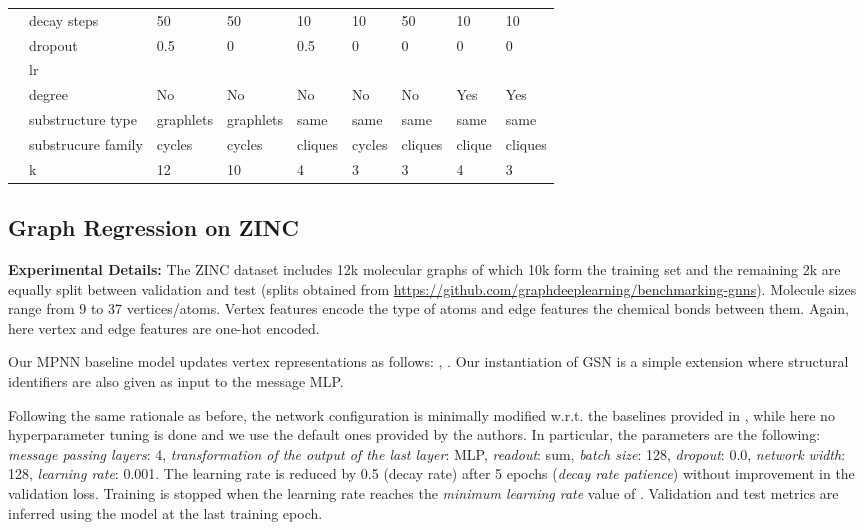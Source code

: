 \begin{table}[t]
{{\begin{tabular}{p{0.8cm}p{3cm}|llll|lll}
        & decay steps & 50 & 50 & 10 & 10 & 50 &  10 & 10 \\
         
         & dropout & 0.5 & 0 & 0.5 & 0 & 0 & 0 & 0\\
         
        & lr &  &  &  & & &  & \\
        
        & degree  & No & No & No & No & No & Yes & Yes\\

        
         
        & substructure type & graphlets & graphlets & same& same & same & same & same\\
        

        & substrucure family & cycles & cycles & cliques &cycles& cliques & clique & cliques\\
       

        
        & k  &12 & 10& 4 & 3 & 3 & 4 & 3\\
        \bottomrule
    \end{tabular}}}
\end{table}


\subsection{Graph Regression on ZINC}\label{zinc_appendix}

\noindent\textbf{Experimental Details: }The ZINC dataset includes 12k molecular graphs of which 10k form the training set and the remaining 2k are equally split between validation and test (splits obtained from \url{https://github.com/graphdeeplearning/benchmarking-gnns}). Molecule sizes range from 9 to 37 vertices/atoms. Vertex features encode the type of atoms and edge features the chemical bonds between them. Again, here vertex and edge features are one-hot encoded. 

Our MPNN baseline model updates vertex representations as follows:  ,     . Our instantiation of GSN is a simple extension where structural identifiers are also given as input to the message MLP. 

Following the same rationale as before, the network configuration is minimally modified w.r.t. the baselines provided in \cite{dwivedi2020benchmarking}, while here no hyperparameter tuning is done and we use the default ones provided by the authors. In particular, the parameters are the following: \textit{message passing layers}: 4, \textit{transformation of the output of the last layer}: MLP, \textit{readout}: sum, \textit{batch size}: 128, \textit{dropout}: 0.0, \textit{network width}: 128, \textit{learning rate}: 0.001. The learning rate is reduced by 0.5 (decay rate) after 5 epochs (\textit{decay rate
patience}) without improvement in the validation loss. Training is stopped when the learning rate reaches the \textit{minimum learning rate} value of .  Validation and test metrics are inferred using the model at the last training epoch. 

